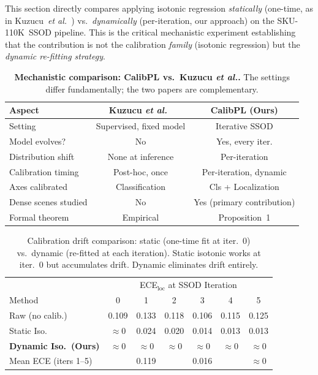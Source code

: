 \documentclass[10pt,twocolumn,letterpaper]{article}
\newcommand{\sku}{\textsc{SKU-110K}}
\def\etal{\emph{et al.}}
\begin{document}
This section directly compares applying isotonic regression \emph{statically}
(one-time, as in Kuzucu~\etal~\cite{kuzucu2024calibration}) vs.\ \emph{dynamically}
(per-iteration, our approach) on the \sku\ SSOD pipeline. This is the critical
mechanistic experiment establishing that the contribution is not the calibration
\emph{family} (isotonic regression) but the \emph{dynamic re-fitting strategy}.

\begin{table}[h]
  \centering
  \caption{\textbf{Mechanistic comparison: CalibPL vs.\ Kuzucu \etal.}
  The settings differ fundamentally; the two papers are complementary.}
  \begin{tabular}{lcc}
    \toprule
    \textbf{Aspect} & \textbf{Kuzucu \etal~\cite{kuzucu2024calibration}} & \textbf{CalibPL (Ours)} \\
    \midrule
    Setting & Supervised, fixed model & Iterative SSOD \\
    Model evolves? & No & Yes, every iter. \\
    Distribution shift & None at inference & Per-iteration \\
    Calibration timing & Post-hoc, once & Per-iteration, dynamic \\
    Axes calibrated & Classification & Cls + Localization \\
    Dense scenes studied & No & Yes (primary contribution) \\
    Formal theorem & Empirical & Proposition~1 \\
    \bottomrule
  \end{tabular}
  \label{tab:kuzucu_mechanism}
\end{table}

\begin{table}[h]
  \centering
  \caption{Calibration drift comparison: static (one-time fit at iter.~0) vs.\
  dynamic (re-fitted at each iteration). Static isotonic works at iter.~0 but
  accumulates drift. Dynamic eliminates drift entirely.}
  \begin{tabular}{lcccccc}
    \toprule
    & \multicolumn{6}{c}{ECE$_\text{loc}$ at SSOD Iteration} \\
    Method & 0 & 1 & 2 & 3 & 4 & 5 \\
    \midrule
    Raw (no calib.)    & 0.109 & 0.133 & 0.118 & 0.106 & 0.115 & 0.125 \\
    Static Iso.~\cite{kuzucu2024calibration} & $\approx$0 & 0.024 & 0.020 & 0.014 & 0.013 & 0.013 \\
    \textbf{Dynamic Iso.\ (Ours)} & $\approx$0 & $\approx$0 & $\approx$0 & $\approx$0 & $\approx$0 & $\approx$0 \\
    \midrule
    Mean ECE (iters 1--5) & & 0.119 & & 0.016 & & $\approx$0 \\
    \bottomrule
  \end{tabular}
  \label{tab:static_vs_dynamic_full}
\end{table}
\end{document}
